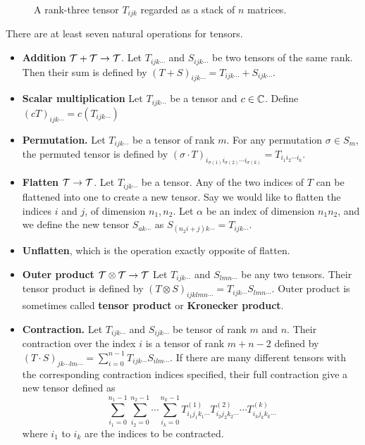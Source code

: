 \begin{figure}[ht]
\centering

\caption{A rank-three tensor $T_{ijk}$ regarded as a stack of $n$ matrices.}
\label{fig:rank3-stack}
\end{figure}



There are at least seven natural operations for tensors.
\begin{observation}
	\begin{itemize} 
		\item \textbf{Addition} $\mathcal{T} + \mathcal{T} \rightarrow \mathcal{T}$. Let $T_{ijk \cdots}$ and $S_{ijk \cdots}$ be two tensors of the same rank. Then their sum is defined by $(T + S)_{ijk \cdots} = T_{ijk \cdots} + S_{ijk \cdots}$.
		\item \textbf{Scalar multiplication} Let $T_{ijk \cdots}$ be a tensor and $c \in \mathbb{C}$. Define $(cT)_{ijk \cdots} =c (T_{ijk \cdots}) $
		\item \textbf{Permutation.} Let $T_{ijk\cdots}$ be a tensor of rank $m$. For any permutation $\sigma \in S_m$, the permuted tensor is defined by $(\sigma \cdot T)_{i_{\sigma(1)} i_{\sigma(2)} \cdots i_{\sigma(k)}} = T_{i_1 i_2 \cdots i_k}$.
		\item \textbf{Flatten} $\mathcal{T} \rightarrow \mathcal{T}$. Let $T_{ijk \cdots}$ be a tensor. 
		Any of the two indices of $T$ can be flattened into one to create a new tensor.
		Say we would like to flatten the indices $i$ and $j$, of dimension $n_1, n_2$. Let $\alpha$ be an index of dimension $n_1n_2$, and we define the new tensor $S_{ak \cdots}$ as $S_{(n_2 i + j)k \cdots} = T_{ijk\cdots}$.
		\item \textbf{Unflatten}, which is the operation exactly opposite of flatten.
		\item \textbf{Outer product} $\mathcal{T} \otimes \mathcal{T} \rightarrow \mathcal{T}$ Let $T_{ijk \cdots}$ and $S_{lmn \cdots}$ be any two tensors.
		Their tensor product is defined by $(T \otimes S)_{ijklmn\cdots} = T_{ijk\cdots} S_{lmn\cdots}$. Outer product is sometimes called \textbf{tensor product} or \textbf{Kronecker product}.
		\item \textbf{Contraction.} Let $T_{ijk\cdots}$ and $S_{ijk \cdots}$ be tensor of rank $m$ and $n$. Their contraction over the index $i$ is a tensor of rank $m+n - 2$ defined by $(T \cdot S)_{jk\cdots lm\cdots} = \sum_{i=0}^{n-1} T_{ijk\cdots} S_{ilm\cdots}$.
		If there are many different tensors with the corresponding contraction indices specified, their full contraction give a new tensor defined as 
		\begin{equation}
			\sum_{i_1=0}^{n_1-1} \sum_{i_2=0}^{n_2-1} \cdots \sum_{i_k=0}^{n_k-1} T^{(1)}_{i_1 j_1 k_1 \cdots} T^{(2)}_{i_2 j_2 k_2 \cdots} \cdots T^{(k)}_{i_k j_k k_k \cdots}
		\end{equation}\label{eq:contraction}
		where $i_1$ to $i_k$ are the indices to be contracted.
	\end{itemize}
\end{observation}

